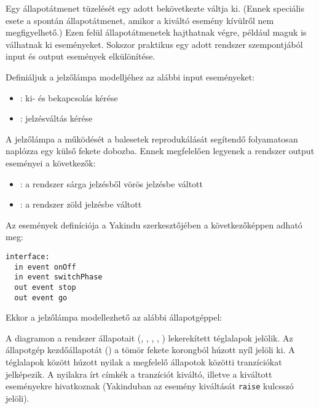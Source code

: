 Egy állapotátmenet tüzelését egy adott  bekövetkezte váltja ki. (Ennek speciális esete a spontán állapotátmenet, amikor a kiváltó esemény kívülről nem megfigyelhető.) Ezen felül állapotátmenetek  hajthatnak végre, például maguk is válhatnak ki eseményeket. Sokszor praktikus egy adott rendszer szempontjából input és output események elkülönítése.

\begin{pelda}
Definiáljuk a jelzőlámpa modelljéhez az alábbi input eseményeket:

\begin{itemize}
	\item {}: ki- és bekapcsolás kérése
	\item {}: jelzésváltás kérése
\end{itemize}

A jelzőlámpa a működését a balesetek reprodukálását segítendő folyamatosan naplózza egy külső fekete dobozba. Ennek megfelelően legyenek a rendszer output eseményei a következők:

\begin{itemize}
	\item {}: a rendszer sárga jelzésből vörös jelzésbe váltott
	\item {}: a rendszer zöld jelzésbe váltott
\end{itemize}

Az események definíciója a Yakindu szerkesztőjében a következőképpen adható meg:

\begin{lstlisting}
interface:
  in event onOff
  in event switchPhase
  out event stop
  out event go
\end{lstlisting}

Ekkor a jelzőlámpa modellezhető az alábbi állapotgéppel:

\end{pelda}

A diagramon a rendszer állapotait (, , , , ) lekerekített téglalapok jelölik. Az állapotgép kezdőállapotát () a tömör fekete korongból húzott nyíl jelöli ki. A téglalapok között húzott nyilak a megfelelő állapotok közötti tranzíciókat jelképezik. A nyilakra írt címkék a tranzíciót kiváltó, illetve a kiváltott eseményekre hivatkoznak (Yakinduban az esemény kiváltását \lstinline{raise} kulcsszó jelöli).

